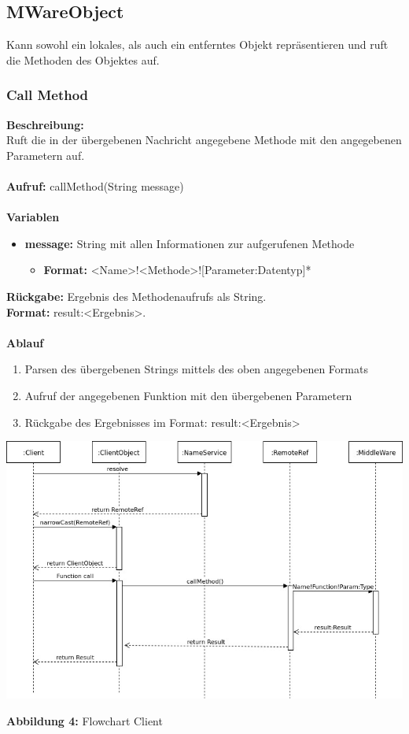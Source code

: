 \subsection{MWareObject}
Kann sowohl ein lokales, als auch ein entferntes Objekt repräsentieren und ruft die Methoden des Objektes auf.

\subsubsection{Call Method}
\textbf{Beschreibung:}\\
Ruft die in der übergebenen Nachricht angegebene Methode mit den angegebenen Parametern auf. \\ \\
\textbf{Aufruf:} callMethod(String message)\\ \\
\textbf{Variablen}
\begin{itemize}
\item \textbf{message:} String mit allen Informationen zur aufgerufenen Methode
\begin{itemize}
\item \textbf{Format:} <Name>!<Methode>![Parameter:Datentyp]*
\end{itemize}
\end{itemize}
\textbf{Rückgabe:} Ergebnis des Methodenaufrufs als String.\\ 
\textbf{Format:} result:<Ergebnis>.\\ \\
\textbf{Ablauf}
\begin{enumerate}
\item Parsen des übergebenen Strings mittels des oben angegebenen Formats
\item Aufruf der angegebenen Funktion mit den übergebenen Parametern
\item Rückgabe des Ergebnisses im Format: result:<Ergebnis>
\end{enumerate}

\includegraphics[scale=0.6]{../pictures/ClientFlowChart.jpg}\\
\centerline{\textbf{Abbildung 4:} Flowchart Client}\\

